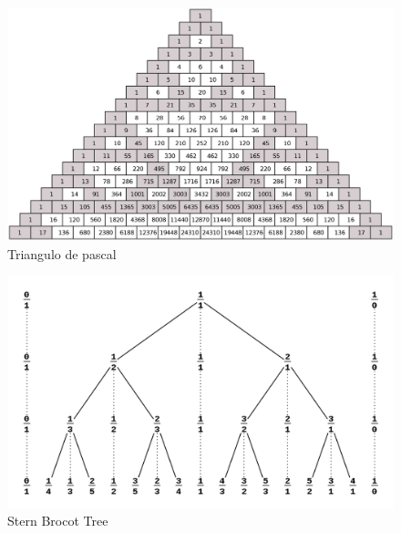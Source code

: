 \begin{figure}[H]
	\includegraphics[width=15cm]{../Imgs/Pascal Triangle.png}
	\caption{Triangulo de pascal}
\end{figure}

\begin{figure}[H]
	\includegraphics[width=15cm]{../Imgs/Stern Brocot Tree.png}
	\caption{Stern Brocot Tree}
\end{figure}
